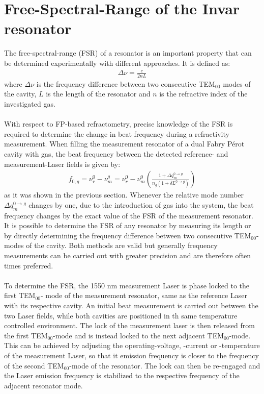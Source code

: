 \section{Free-Spectral-Range of the Invar resonator}
The free-spectral-range (FSR) of a resonator is an important property that can be determined experimentally with different approaches.
It is defined as: 
\begin{align}
	\Delta \nu = \frac{c}{2 n L}
\end{align}
where $\Delta \nu$ is the frequency difference between two consecutive TEM$_{00}$ modes of the cavity, $L$ is the length of the resonator and $n$ is the refractive index of the investigated gas. \\\\
With respect to FP-based refractometry, precise knowledge of the FSR is required to determine the change in beat frequency during a refractivity measurement. When filling the measurement resonator of a dual Fabry Pérot cavity with gas, the beat frequency between the detected reference- and measurement-Laser fields is given by:
\begin{align}
	f_{0,g} =\nu_{r}^{0}-\nu_{m}^{g}= \nu_{r}^{0}-\nu_{m}^{0} \left(\frac{1+\Delta q_m^{0 \rightarrow g}}{n_g(1+\delta L^{0 \rightarrow g})}    \right)
\end{align}
as it was shown in the previous section. Whenever the relative mode number $\Delta q_m^{0 \rightarrow g}$ changes by one, due to the introduction of gas into the system, the beat frequency changes by the exact value of the FSR of the measurement resonator.
It is possible to determine the FSR of any resonator by measuring its length or by directly determining the frequency difference between two consecutive TEM$_{00}$-modes of the cavity. Both methods are valid but generally frequency measurements can be carried out with greater precision and are therefore often times preferred. \\\\
To determine the FSR, the 1550 nm measurement Laser is phase locked to the first TEM$_{00}$- mode of the measurement resonator, same as the reference Laser with its respective cavity. An initial beat measurement is carried out between the two Laser fields, while both cavities are positioned in th same temperature controlled environment. The lock of the measurement laser is then released from the first TEM$_{00}$-mode and is instead locked to the next adjacent TEM$_{00}$-mode. This can be achieved by adjusting the operating-voltage, -current or -temperature of the measurement Laser, so that it emission frequency is closer to the frequency of the second TEM$_{00}$-mode of the resonator. The lock can then be re-engaged and the Laser emission frequency is stabilized to the respective frequency of the adjacent resonator mode. \\\\
